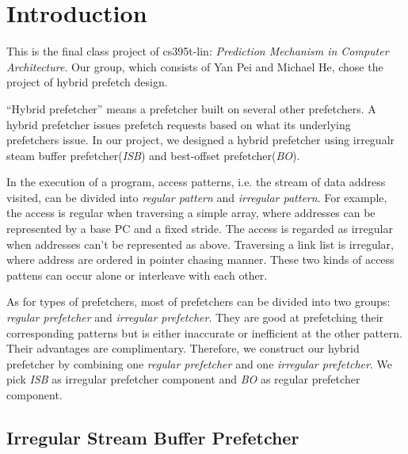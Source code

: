 \section{Introduction}
\label{sec:intro}

This is the final class project of cs395t-lin: \emph{Prediction Mechanism in Computer Architecture}. Our group, which consists of Yan Pei and Michael He, chose the project of hybrid prefetch design.

``Hybrid prefetcher'' means a prefetcher built on several other prefetchers. A hybrid prefetcher issues prefetch requests based on what its underlying prefetchers issue. In our project, we designed a hybrid prefetcher using irregualr steam buffer prefetcher(\emph{ISB})\cite{isbpaper} and best-offset prefetcher(\emph{BO})\cite{bopaper}.

In the execution of a program, access patterns, i.e. the stream of data address visited, can be divided into \emph{regular pattern} and \emph{irregular pattern}. For example, the access is regular when traversing a simple array, where addresses can be represented by a base PC and a fixed stride. The access is regarded as irregular when addresses can't be represented as above.  Traversing a link list is irregular, where address are ordered in pointer chasing manner. These two kinds of access pattens can occur alone or interleave with each other.

As for types of prefetchers, most of prefetchers can be divided into two groups: \emph{regular prefetcher}\cite{bopaper, sandboxpaper} and \emph{irregular prefetcher}\cite{isbpaper, ghbpaper, reinforcementlearning}.
They are good at prefetching their corresponding patterns but is either inaccurate or inefficient at the other pattern. Their advantages are complimentary.
Therefore, we construct our hybrid prefetcher by combining one \emph{regular prefetcher} and one \emph{irregular prefetcher}.
We pick \emph{ISB}\cite{isbpaper} as irregular prefetcher component and \emph{BO}\cite{bopaper} as regular prefetcher component.

  \subsection{Irregular Stream Buffer Prefetcher}
  \label{sec:isbintro}

